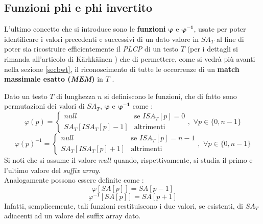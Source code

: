\subsection{Funzioni phi e phi invertito}
L'ultimo concetto che si introduce sono le \textbf{funzioni}
$\boldsymbol\varphi$ e $\mathbf{\boldsymbol\varphi^{-1}}$, usate per poter
identificare i valori precedenti e successivi di 
un dato valore in $SA_T$ al fine di poter sia ricostruire efficientemente il
\textit{PLCP} di un testo $T$ (per i dettagli si rimanda all'articolo di
K\"{a}rkk\"{a}inen \cite{plcp}) che di permettere, come si vedrà più 
avanti nella sezione \ref{secbwt}, il riconoscimento di tutte le occorrenze di
un \textbf{match massimale esatto (\textit{MEM})} in $T$ \cite{phoni}.
\begin{definizione}
  Dato un testo $T$ di lunghezza $n$ si definiscono le funzioni, che di fatto
  sono permutazioni dei valori di $SA_T$, $\boldsymbol\varphi$ e
  $\mathbf{\boldsymbol\varphi^{-1}}$ come \cite{phoni}: 
  \[\varphi(p)=
    \begin{cases}
      null&\mbox{se } ISA_T[p]=0\\
      SA_T[ISA_T[p]-1]&\mbox{altrimenti}
    \end{cases},\,\,\forall p\in\{0,n-1\}
  \]
   \[\varphi(p)^{-1}=
    \begin{cases}
      null&\mbox{se } ISA_T[p]=n-1\\
      SA_T[ISA_T[p]+1]&\mbox{altrimenti}
    \end{cases},\,\,\forall p\in\{0,n-1\}
  \]
  Si noti che si assume il valore $null$ quando, rispettivamente, si studia il
  primo e l'ultimo valore del \textit{suffix array}.\\
  Analogamente possono essere definite come \cite{plcp}:
  \[\varphi[SA[p]]=SA[p-1]\]
  \[\varphi^{-1}[SA[p]]=SA[p+1]\]
  Infatti, semplicemente, tali funzioni restituiscono i due valori, se
  esistenti, di $SA_T$ adiacenti ad un valore del suffix array dato.
\end{definizione}
